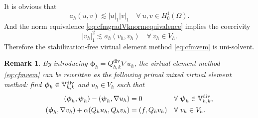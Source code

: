 \documentclass[10pt]{amsart}
\newtheorem{theorem}{Theorem}[section]
\newtheorem{lemma}[theorem]{Lemma}
\newtheorem{remark}[theorem]{Remark}
\renewcommand{\div}{\operatorname{div}}
\numberwithin{equation}{section}
\begin{document}
It is obvious that 
\begin{equation}\label{eq:cfmahbounedness}
a_h(u, v)\lesssim |u|_1|v|_1\quad\forall~u,v\in H_0^1(\Omega).
\end{equation}   
And the norm equivalence \eqref{eq:cfmgradVknormequivalence} implies
the coercivity
\begin{equation}\label{eq:cfmahcoercivity}
|v_h|_1^2\lesssim a_h(v_h, v_h)\quad\forall~v_h\in V_h.
\end{equation}  
Therefore the stabilization-free virtual element method \eqref{eq:cfmvem} is uni-solvent.

\begin{remark}\rm
By introducing $\boldsymbol{\phi}_h=Q_{h,k}^{\div}\nabla u_h$, the virtual element method \eqref{eq:cfmvem} can be rewritten as the following primal mixed virtual element method: find $\boldsymbol{\phi}_h\in\mathbb{V}_{h,k}^{\rm div}$ and $u_h\in V_h$ such that
\begin{equation*}
\begin{aligned}
(\boldsymbol{\phi}_h, \boldsymbol{\psi}_h) - (\boldsymbol{\psi}_h, \nabla u_h)&=0 \quad\quad\quad\quad\;\;\forall~\boldsymbol{\psi}_h\in\mathbb{V}_{h,k}^{\rm div},\\
(\boldsymbol{\phi}_h, \nabla v_h)+\alpha(Q_hu_h, Q_hv_h)&=(f, Q_hv_h)\quad\forall~v_h\in V_h.
\end{aligned} 
\end{equation*} 
\end{remark}



\end{document}
